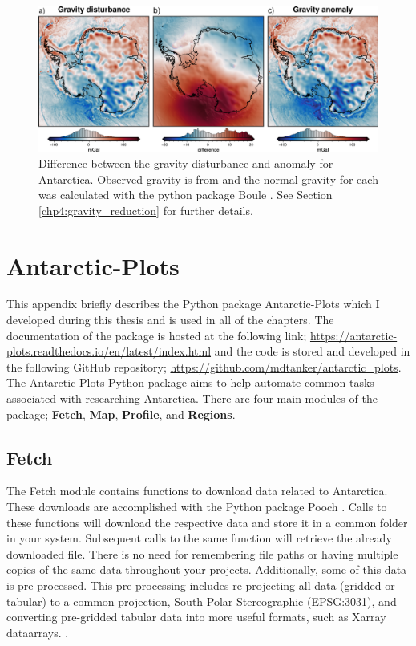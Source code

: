 \begin{figure}[!ht]
    \centering
    \includegraphics[width=.7\textwidth]{figures/chp4/antarctic_disturbance_vs_anomaly}
    \caption[Gravity disturbance vs. anomaly]{Difference between the gravity disturbance and anomaly for Antarctica. Observed gravity is from \citet{försteeigen6c42014} and the normal gravity for each was calculated with the python package Boule \citep{fatiandoaterraprojectboule2022}. See Section \ref{chp4:gravity_reduction} for further details.}
    \label{fig:appC_disturbance_vs_anomaly}
\end{figure}

\clearpage






\chapter{Antarctic-Plots} \label{appendix:D}

This appendix briefly describes the Python package Antarctic-Plots \citep{tankersleyantarctic2023} which I developed during this thesis and is used in all of the chapters. The documentation of the package is hosted at the following link; \url{https://antarctic-plots.readthedocs.io/en/latest/index.html} and the code is stored and developed in the following GitHub repository;  \url{https://github.com/mdtanker/antarctic_plots}. \\

The Antarctic-Plots Python package aims to help automate common tasks associated with researching Antarctica. There are four main modules of the package; \textbf{Fetch}, \textbf{Map}, \textbf{Profile}, and \textbf{Regions}.

\section{Fetch}

The Fetch module contains functions to download data related to Antarctica. These downloads are accomplished with the Python package Pooch \citet{uiedapooch2020}. Calls to these functions will download the respective data and store it in a common folder in your system. Subsequent calls to the same function will retrieve the already downloaded file. There is no need for remembering file paths or having multiple copies of the same data throughout your projects. Additionally, some of this data is pre-processed. This pre-processing includes re-projecting all data (gridded or tabular) to a common projection, South Polar Stereographic (EPSG:3031), and converting pre-gridded tabular data into more useful formats, such as Xarray dataarrays. \citep{hoyerxarray2017}.

